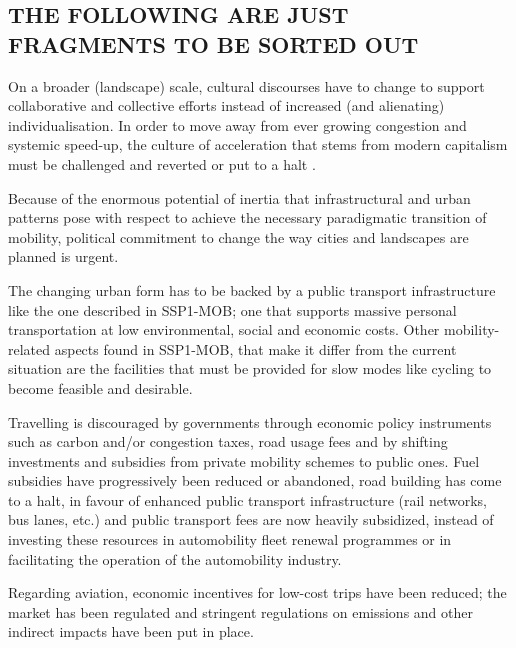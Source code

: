 %
%
\subsection*{THE FOLLOWING ARE JUST FRAGMENTS TO BE SORTED OUT}

On a broader (landscape) scale, cultural discourses have to change to support collaborative and collective efforts instead of increased (and alienating) individualisation. In order to move away from ever growing congestion and systemic speed-up, the culture of acceleration that stems from modern capitalism must be challenged and reverted or put to a halt \textcite{zijlstra2012_SocioSpatialPerspective}.

Because of the enormous potential of inertia that infrastructural and urban patterns pose with respect to achieve the necessary paradigmatic transition of mobility, political commitment to change the way cities and landscapes are planned is urgent.

The changing urban form has to be backed by a public transport infrastructure like the one described in SSP1-MOB; one that supports massive personal transportation at low environmental, social and economic costs. Other mobility-related aspects found in SSP1-MOB, that make it differ from the current situation are the facilities that must be provided for slow modes like cycling to become feasible and desirable.

Travelling is discouraged by governments through economic policy instruments such as carbon and/or congestion taxes, road usage fees and by shifting investments and subsidies from private mobility schemes to public ones. Fuel subsidies have progressively been reduced or abandoned, road building has come to a halt, in favour of enhanced public transport infrastructure (rail networks, bus lanes, etc.) and public transport fees are now heavily subsidized, instead of investing these resources in automobility fleet renewal programmes or in facilitating the operation of the automobility industry.

Regarding aviation, economic incentives for low-cost trips have been reduced; the market has been regulated and stringent regulations on emissions and other indirect impacts have been put in place.
